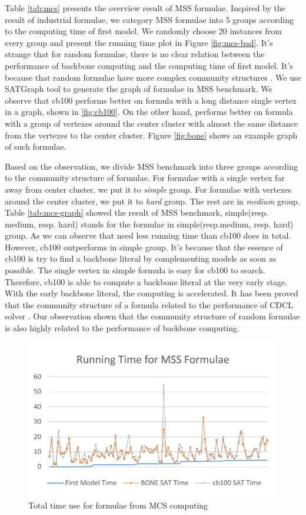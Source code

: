 Table \ref{tab:mcs} presents the overview result of MSS formulae. Inspired by the result of industrial formulae, we category MSS formulae into 5 groups according to the computing time of first model. We randomly choose 20 instances from every group and present the running time plot in Figure \ref{fig:mcs-bad}. It's strange that for random formulae, there is no clear relation between the performance of backbone computing and the computing time of first model. It's because that random formulae have more complex community structures \cite{NZG2014,LJG2015SAT,LJG015}. We use SATGraph \cite{NZW2015} tool to generate the graph of formulae in MSS benchmark. We observe that cb100 performs better on formula with a long distance single vertex in a graph, shown in \ref{fig:cb100}. On the other hand, \tool performs better on formula with a group of vertexes around the center cluster with almost the same distance from the vertexes to the center cluster. Figure \ref{fig:bone} shows an example graph of such formulae.

Based on the observation, we divide MSS benchmark into three groups according to the community structure of formulae. For formulae with a single vertex far away from center cluster, we put it to \emph{simple} group. For formulae with vertexes around the center cluster, we put it to \emph{hard} group. The rest are in \emph{medium} group. Table \ref{tab:mcs-graph} showed the result of MSS benchmark, simple(resp. medium, resp. hard) stands for the formulae in simple(resp.medium, resp. hard) group. As we can observe that \tool need less running time than cb100 does in total. However, cb100 outperforms \tool in simple group. It's because that the essence of cb100 is try to find a backbone literal by complementing models as soon as possible. The single vertex in simple formula is easy for cb100 to search. Therefore, cb100 is able to compute a backbone literal at the very early stage. With the early backbone literal, the computing is accelerated. It has been proved that the community structure of a formula related to the performance of CDCL solver \cite{NZG2014}. Our observation shown that the community structure of random formulae is also highly related to the performance of backbone computing.

\begin{figure}
    \centering
    \includegraphics[scale=0.7]{mcs.pdf}
   \caption{Total time use for formulae from MCS computing}
   \label{fig:mcs-time}
\end{figure}


